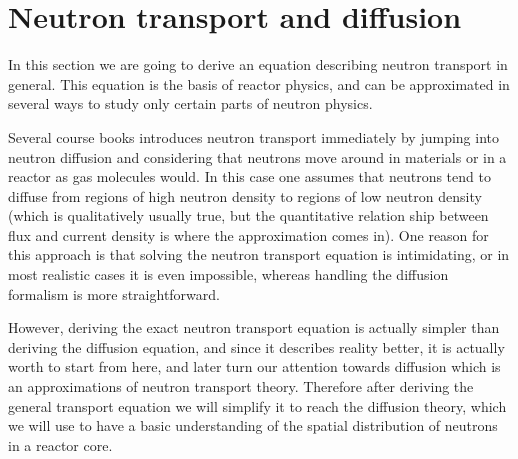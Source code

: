 % 
%
% 
%
%
%
%
%

\section{Neutron transport and diffusion}

In this section we are going to derive an equation describing neutron transport in general. This equation is the basis of reactor physics, and can be approximated in several ways to study only certain parts of neutron physics.

Several course books introduces neutron transport immediately by jumping into neutron diffusion and considering that neutrons move around in materials or in a reactor as gas molecules would. In this case one assumes that neutrons tend to diffuse from regions of high neutron density to regions of low neutron density (which is qualitatively usually true, but the quantitative relation ship between flux and current density is where the approximation comes in). One reason for this approach is that solving the neutron transport equation is intimidating, or in most realistic cases it is even impossible, whereas handling the diffusion formalism is more straightforward.

However, deriving the exact neutron transport equation is actually simpler than deriving the diffusion equation, and since it describes reality better, it is actually worth to start from here, and later turn our attention towards diffusion which is an approximations of neutron transport theory. Therefore after deriving the general transport equation we will simplify it to reach the diffusion theory, which we will use to have a basic understanding of the spatial distribution of neutrons in a reactor core.

